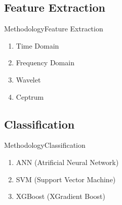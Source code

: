 \documentclass[10pt]{beamer}
\begin{document}
\subsection{Feature Extraction}

\begin{frame}{Methodology}{Feature Extraction}

\begin{enumerate}
	\item Time Domain
	\item Frequency Domain
	\item Wavelet
	\item Ceptrum
\end{enumerate}{}

\end{frame}



\subsection{Classification}
\begin{frame}{Methodology}{Classification}

\begin{enumerate}
	\item ANN (Atrificial Neural Network)
	\item SVM (Support Vector Machine)
	\item XGBoost (XGradient Boost)
\end{enumerate}{}

\end{frame}

\end{document}
